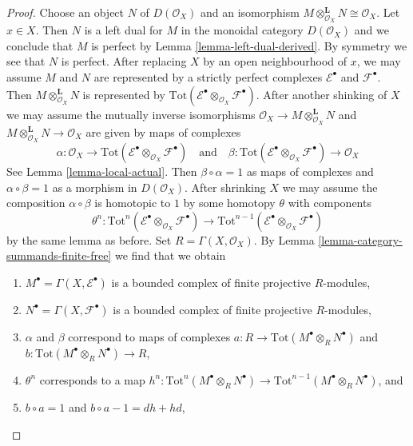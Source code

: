 \begin{proof}
\medskip\noindent
Choose an object $N$ of $D(\mathcal{O}_X)$
and an isomorphism
$M \otimes_{\mathcal{O}_X}^\mathbf{L} N \cong \mathcal{O}_X$.
Let $x \in X$.
Then $N$ is a left dual for $M$ in the monoidal category
$D(\mathcal{O}_X)$ and we conclude that $M$ is perfect by
Lemma \ref{lemma-left-dual-derived}. By symmetry we see that
$N$ is perfect. After replacing $X$ by an open neighbourhood of $x$,
we may assume $M$ and $N$ are represented by a strictly perfect
complexes $\mathcal{E}^\bullet$ and $\mathcal{F}^\bullet$.
Then $M \otimes_{\mathcal{O}_X}^\mathbf{L} N$ is represented by
$\text{Tot}(\mathcal{E}^\bullet \otimes_{\mathcal{O}_X} \mathcal{F}^\bullet)$.
After another shinking of $X$ we may assume the mutually inverse
isomorphisms
$\mathcal{O}_X \to M \otimes_{\mathcal{O}_X}^\mathbf{L} N$ and
$M \otimes_{\mathcal{O}_X}^\mathbf{L} N \to \mathcal{O}_X$
are given by maps of complexes
$$
\alpha : \mathcal{O}_X \to
\text{Tot}(\mathcal{E}^\bullet \otimes_{\mathcal{O}_X} \mathcal{F}^\bullet)
\quad\text{and}\quad
\beta :
\text{Tot}(\mathcal{E}^\bullet \otimes_{\mathcal{O}_X} \mathcal{F}^\bullet)
\to \mathcal{O}_X
$$
See Lemma \ref{lemma-local-actual}. Then $\beta \circ \alpha = 1$
as maps of complexes and $\alpha \circ \beta = 1$ as a morphism
in $D(\mathcal{O}_X)$. After shrinking $X$
we may assume the composition $\alpha \circ \beta$ is homotopic to $1$
by some homotopy $\theta$ with components
$$
\theta^n :
\text{Tot}^n(\mathcal{E}^\bullet \otimes_{\mathcal{O}_X} \mathcal{F}^\bullet)
\to
\text{Tot}^{n - 1}(
\mathcal{E}^\bullet \otimes_{\mathcal{O}_X} \mathcal{F}^\bullet)
$$
by the same lemma as before. Set $R = \Gamma(X, \mathcal{O}_X)$. By
Lemma \ref{lemma-category-summands-finite-free}
we find that we obtain
\begin{enumerate}
\item $M^\bullet = \Gamma(X, \mathcal{E}^\bullet)$ is a bounded complex
of finite projective $R$-modules,
\item $N^\bullet = \Gamma(X, \mathcal{F}^\bullet)$ is a bounded complex
of finite projective $R$-modules,
\item $\alpha$ and $\beta$ correspond to maps of complexes
$a : R \to \text{Tot}(M^\bullet \otimes_R N^\bullet)$ and
$b : \text{Tot}(M^\bullet \otimes_R N^\bullet) \to R$,
\item $\theta^n$ corresponds to a map
$h^n : \text{Tot}^n(M^\bullet \otimes_R N^\bullet) \to
\text{Tot}^{n - 1}(M^\bullet \otimes_R N^\bullet)$, and
\item $b \circ a = 1$ and $b \circ a - 1 = dh + hd$,
\end{enumerate}

\end{proof}
